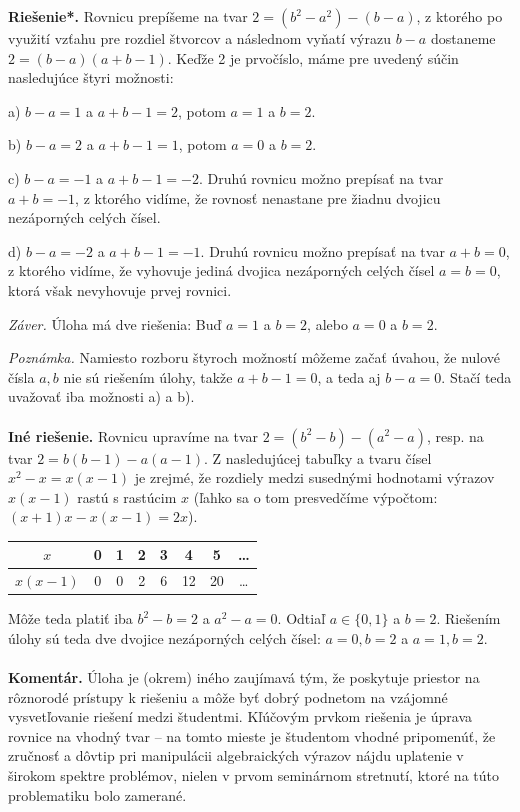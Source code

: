 \documentclass[11pt,a4paper,oneside,final]{book}
\newcommand{\kom}{\textbf{Komentár.} }
\newcommand{\rieh}{\textbf{Riešenie*.} }
\begin{document}
\rieh Rovnicu prepíšeme na tvar $2 = (b^2 -a^2 )-(b-a)$, z ktorého po využití vzťahu pre rozdiel štvorcov a následnom vyňatí výrazu $b - a$ dostaneme $2 = (b - a)(a + b - 1)$.
Keďže 2 je prvočíslo, máme pre uvedený súčin nasledujúce štyri možnosti:

a) $b - a = 1$ a $a + b - 1 = 2$, potom $a = 1$ a $b = 2.$

b) $b - a = 2$ a $a + b - 1 = 1$, potom $a = 0$ a $b = 2$.

c) $b - a = -1$ a $a + b - 1 = -2$. Druhú rovnicu možno prepísať na tvar $a + b = -1$, z ktorého vidíme, že rovnosť nenastane pre žiadnu dvojicu nezáporných celých čísel.

d) $b - a = -2$ a $a + b - 1 = -1$. Druhú rovnicu možno prepísať na tvar $a + b = 0$, z ktorého vidíme, že vyhovuje jediná dvojica nezáporných celých čísel $a = b = 0$, ktorá však nevyhovuje prvej rovnici.

\textit{Záver.} Úloha má dve riešenia: Buď $a = 1$ a $b = 2$, alebo $a = 0$ a $b = 2$.

\textit{Poznámka.} Namiesto rozboru štyroch možností môžeme začať úvahou, že nulové čísla $a, b$ nie sú riešením úlohy, takže $a + b - 1 = 0$, a teda aj $b - a = 0$. Stačí teda uvažovať iba možnosti a) a b).\\
\\
\textbf{Iné riešenie.} Rovnicu upravíme na tvar $2 = (b^2 - b) - (a^2 - a)$, resp. na tvar $2 = b(b - 1)-a(a-1)$. Z nasledujúcej tabuľky a tvaru čísel $x^2 -x = x(x-1)$ je zrejmé, že rozdiely medzi susednými hodnotami výrazov $x(x - 1)$ rastú s rastúcim $x$ (ľahko sa o tom presvedčíme výpočtom: $(x + 1)x - x(x - 1) = 2x$).
\begin{center}
\begin{tabular}{|c|c|c|c|c|c|c|c|}
\hline
$x$ & 0 & 1 & 2 & 3 & 4 & 5 & \ldots \\
\hline
$x(x-1)$ & 0 & 0 & 2 & 6 & 12 & 20 & \ldots\\
\hline
\end{tabular}
\end{center}
Môže teda platiť iba $b^2 - b = 2$ a $a^2 - a = 0$. Odtiaľ $a \in \{0, 1\}$ a $b = 2$. Riešením úlohy sú teda dve dvojice nezáporných celých čísel: $a = 0, b = 2$ a $a = 1, b = 2$.\\
\\
\kom Úloha je (okrem) iného zaujímavá tým, že poskytuje priestor na rôznorodé prístupy k riešeniu a môže byť dobrý podnetom na vzájomné vysvetľovanie riešení medzi študentmi. Kľúčovým prvkom riešenia je úprava rovnice na vhodný tvar -- na tomto mieste je študentom vhodné pripomenúť, že zručnosť a dôvtip pri manipulácii algebraických výrazov nájdu uplatenie v širokom spektre problémov, nielen v prvom seminárnom stretnutí, ktoré na túto problematiku bolo zamerané.
\end{document}
